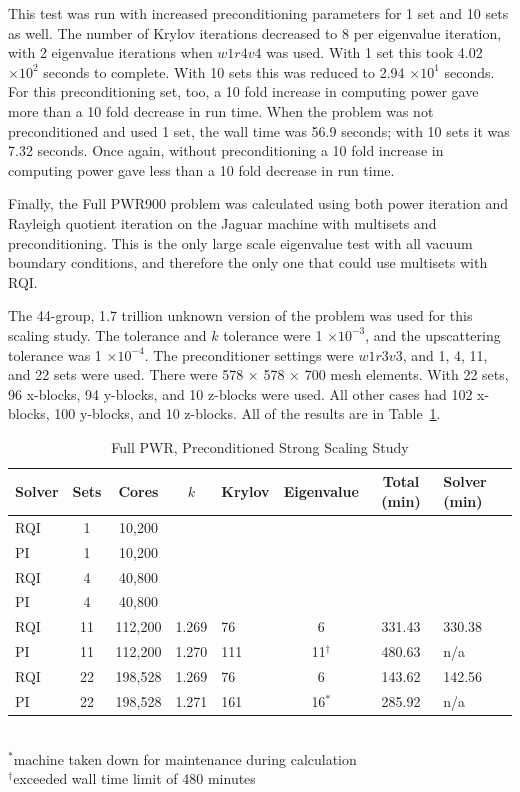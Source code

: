 This test was run with increased preconditioning parameters for 1 set and 10 sets as well. The number of Krylov iterations decreased to 8 per eigenvalue iteration, with 2 eigenvalue iterations when $w1r4v4$ was used. With 1 set this took 4.02 $\times 10^{2}$ seconds to complete. With 10 sets this was reduced to 2.94 $\times 10^{1}$ seconds. For this preconditioning set, too, a 10 fold increase in computing power gave more than a 10 fold decrease in run time. When the problem was not preconditioned and used 1 set, the wall time was 56.9 seconds; with 10 sets it was 7.32 seconds. Once again, without preconditioning a 10 fold increase in computing power gave less than a 10 fold decrease in run time. 
 
Finally, the Full PWR900 problem was calculated using both power iteration and Rayleigh quotient iteration on the Jaguar machine with multisets and preconditioning. This is the only large scale eigenvalue test with all vacuum boundary conditions, and therefore the only one that could use multisets with RQI. 

The 44-group, 1.7 trillion unknown version of the problem was used for this scaling study. The tolerance and $k$ tolerance were 1 $\times 10^{-3}$, and the upscattering tolerance was 1 $\times 10^{-4}$. The preconditioner settings were $w1r3v3$, and 1, 4, 11, and 22 sets were used. There were 578 $\times$ 578 $\times$ 700 mesh elements. With 22 sets, 96 x-blocks, 94 y-blocks, and 10 z-blocks were used. All other cases had 102 x-blocks, 100 y-blocks, and 10 z-blocks. All of the results are in Table~\ref{table:full PWR}. 
%
\begin{table}[!h]
\caption{Full PWR, Preconditioned Strong Scaling Study}
\begin{center}
\begin{tabular}{l c c c l c c l}
\hline
Solver & Sets & Cores & $k$ & Krylov & Eigenvalue & Total (min) & Solver (min)\\[0.5ex]
\hline
RQI & 1   & 10,200   &  &   &                   &  &  \\
PI    & 1   & 10,200   &  &  &       &  &  \\
RQI & 4   & 40,800   &  &    &                   &  &  \\
PI    & 4   & 40,800   &  &  &        &  &  \\
RQI & 11 & 112,200 & 1.269 & 76   & 6                  & 331.43 & 330.38 \\
PI    & 11 & 112,200 & 1.270 & 111 & 11$^{\dag}$ & 480.63 & n/a \\
RQI & 22 & 198,528 & 1.269 & 76   & 6                  & 143.62 & 142.56 \\
PI    & 22 & 198,528 & 1.271 & 161 & 16$^{*}$       & 285.92 & n/a \\
\hline 
\end{tabular}\\
$^{*}$machine taken down for maintenance during calculation \\
$^{\dag}$exceeded wall time limit of 480 minutes
\end{center}
\label{table:full PWR}
\end{table}  

